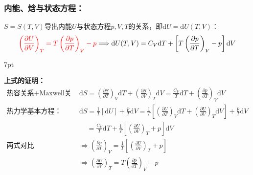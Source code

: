 \documentclass[zihao=5,UTF8]{report}
\newenvironment{graybox}{%
\def\FrameCommand{%
\hspace{1pt}%
{\color{gray}\small \vrule width 2pt}%
{\color{graybox_color}\vrule width 4pt}%
\colorbox{graybox_color}%
}%
\MakeFramed{\advance\hsize-\width\FrameRestore}%
\noindent\hspace{-4.55pt}%
\begin{adjustwidth}{}{7pt}%
\vspace{2pt}\vspace{2pt}%
}
{%
\vspace{2pt}\end{adjustwidth}\endMakeFramed%
}
\begin{document}
\subsubsection{内能、焓与状态方程：}
\noindent{} $S = S(T,V)$导出内能$U$与状态方程$p,V,T$的关系，即$\mathrm{d}U = \mathrm{d}U(T,V)$：
\begin{gather}{\color{red}
    \left(\frac{\partial U }{\partial V }\right)_{T} = T \left(\frac{\partial p }{\partial T }\right)_{V} -p}
    \Longrightarrow 
    \mathrm{d}U(T,V) = C_V\mathrm{d}T + \left[ T \left(\frac{\partial p }{\partial T }\right)_{V} -p\right]\mathrm{d}V 
\end{gather}
\begin{graybox}
\textbf{上式的证明：}
\begin{align*}
    \text{热容关系+Maxwell关系：}&\mathrm{d}S = \left(\frac{\partial S }{\partial T }\right)_{V}\mathrm{d}T + \left(\frac{\partial S }{\partial V }\right)_{T}\mathrm{d}V=\frac{C_V}{T}\mathrm{d}T + \left(\frac{\partial p }{\partial T }\right)_{V}\mathrm{d}V\\ \label{ eq:S-T-V}
    \text{热力学基本方程：}&\mathrm{d}S =\frac{1}{T}\left[\mathrm{d}U\right] + \frac{p}{T}\mathrm{d}V = \frac{1}{T}\left[ \left(\frac{\partial U }{\partial T  }\right)_{V}\mathrm{d}T + \left(\frac{\partial U }{\partial V }\right)_{T}\mathrm{d}V \right] + \frac{p}{T}\mathrm{d}V \\ 
    &\ \ \ \ \ = \frac{C_V}{T}\mathrm{d}T + \frac{1}{T} \left[\left(\frac{\partial U }{\partial V }\right)_{T} + p\right]\mathrm{d}V\\ 
    \text{两式对比}\ &\Longrightarrow \left(\frac{\partial p }{\partial T }\right)_{V} = \frac{1}{T} \left[\left(\frac{\partial U }{\partial V }\right)_{T} + p\right] \\ 
    &\Longrightarrow \left(\frac{\partial U }{\partial V }\right)_{T} = T \left(\frac{\partial p }{\partial T }\right)_{V} -p
\end{align*}
\end{graybox}
\end{document}
